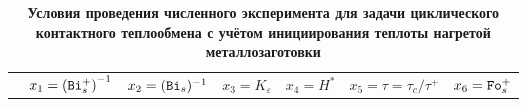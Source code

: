 \begin{table}
\small\centering
\caption{\bf Условия проведения численного эксперимента для задачи циклического
контактного теплообмена с учётом инициирования теплоты нагретой
металлозаготовки} \vspace{-3mm}
\begin{tabular}{l|c|c|c|c|c|c} \hline
 & 
\footnotesize $x_1= \left({\tt Bi}_s^+ \right)^{-1}$ & 
\footnotesize $x_2=({\tt Bi}_s)^{-1}$ & 
\footnotesize $x_3=K_\varepsilon$ & 
\footnotesize $x_4=H^*$ &  
\footnotesize $x_5=\tau =\tau_c/\tau^+$& 
\footnotesize $x_6={\tt Fo}_s^+$ \\


\end{tabular}
\end{table}
